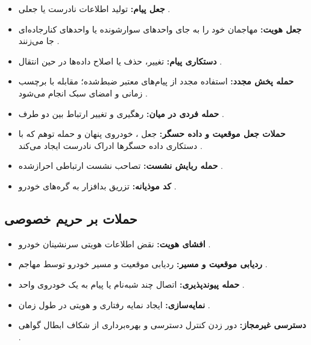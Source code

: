 \documentclass[12pt,a4paper]{article}
\begin{document}
\begin{itemize}
  \item \textbf{جعل پیام:} تولید اطلاعات نادرست یا جعلی \cite{farsimadanReviewSecurityChallenges2025}.
  \item \textbf{جعل هویت:} مهاجمان خود را به جای واحدهای سوارشونده یا واحدهای کنارجاده‌ای جا می‌زنند \cite{VanetSecurityPrivacy}.
  \item \textbf{دستکاری پیام:} تغییر، حذف یا اصلاح داده‌ها در حین انتقال \cite{farsimadanReviewSecurityChallenges2025}.
  \item \textbf{حمله پخش مجدد:} استفاده مجدد از پیام‌های معتبر ضبط‌شده؛ مقابله با برچسب زمانی و امضای سبک  انجام می‌شود \cite{farsimadanReviewSecurityChallenges2025, VanetSecurityPrivacy}.
  \item \textbf{حمله فردی در میان:} رهگیری و تغییر ارتباط بین دو طرف \cite{farsimadanReviewSecurityChallenges2025}.
  \item \textbf{حملات جعل موقعیت و داده حسگر:} جعل ، خودروی پنهان و حمله توهم که با دستکاری داده حسگرها ادراک نادرست ایجاد می‌کند \cite{farsimadanReviewSecurityChallenges2025}.
  \item \textbf{حمله ربایش نشست:} تصاحب نشست ارتباطی احرازشده \cite{farsimadanReviewSecurityChallenges2025}.
  \item \textbf{کد موذیانه:} تزریق بدافزار به گره‌های خودرو \cite{farsimadanReviewSecurityChallenges2025}.
\end{itemize}

\subsection{حملات بر حریم خصوصی}

\begin{itemize}
  \item \textbf{افشای هویت:} نقض اطلاعات هویتی سرنشینان خودرو \cite{farsimadanReviewSecurityChallenges2025}.
  \item \textbf{ردیابی موقعیت و مسیر:} ردیابی موقعیت و مسیر خودرو توسط مهاجم \cite{farsimadanReviewSecurityChallenges2025}.
  \item \textbf{حمله پیوندپذیری:} اتصال چند شبه‌نام یا پیام به یک خودروی واحد \cite{rahmawatiagustinaSystematicLiteratureReview2025}.
  \item \textbf{نمایه‌سازی:} ایجاد نمایه رفتاری و هویتی در طول زمان \cite{VanetSecurityPrivacy}.
  \item \textbf{دسترسی غیرمجاز:} دور زدن کنترل دسترسی و بهره‌برداری از شکاف ابطال گواهی \cite{rahmawatiagustinaSystematicLiteratureReview2025}.
\end{itemize}
\end{document}
